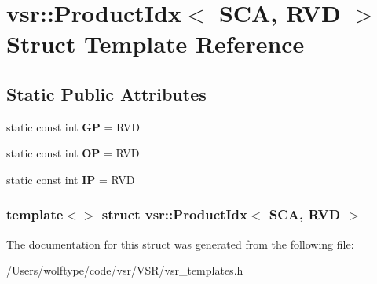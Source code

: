 \hypertarget{structvsr_1_1_product_idx_3_01_s_c_a_00_01_r_v_d_01_4}{\section{vsr\-:\-:Product\-Idx$<$ S\-C\-A, R\-V\-D $>$ Struct Template Reference}
\label{structvsr_1_1_product_idx_3_01_s_c_a_00_01_r_v_d_01_4}
}
\subsection*{Static Public Attributes}
\begin{DoxyCompactItemize}
\item 
\hypertarget{structvsr_1_1_product_idx_3_01_s_c_a_00_01_r_v_d_01_4_ab4884f9050cbbeeb4c7c5ce38912032c}{static const int {\bfseries G\-P} = R\-V\-D}\label{structvsr_1_1_product_idx_3_01_s_c_a_00_01_r_v_d_01_4_ab4884f9050cbbeeb4c7c5ce38912032c}

\item 
\hypertarget{structvsr_1_1_product_idx_3_01_s_c_a_00_01_r_v_d_01_4_a171bc28ab628418ef05ec6f4c764f6ec}{static const int {\bfseries O\-P} = R\-V\-D}\label{structvsr_1_1_product_idx_3_01_s_c_a_00_01_r_v_d_01_4_a171bc28ab628418ef05ec6f4c764f6ec}

\item 
\hypertarget{structvsr_1_1_product_idx_3_01_s_c_a_00_01_r_v_d_01_4_a67837033ca489bd871a3b957b3044523}{static const int {\bfseries I\-P} = R\-V\-D}\label{structvsr_1_1_product_idx_3_01_s_c_a_00_01_r_v_d_01_4_a67837033ca489bd871a3b957b3044523}

\end{DoxyCompactItemize}
\subsubsection*{template$<$$>$ struct vsr\-::\-Product\-Idx$<$ S\-C\-A, R\-V\-D $>$}



The documentation for this struct was generated from the following file\-:\begin{DoxyCompactItemize}
\item 
/\-Users/wolftype/code/vsr/\-V\-S\-R/vsr\-\_\-templates.\-h\end{DoxyCompactItemize}
